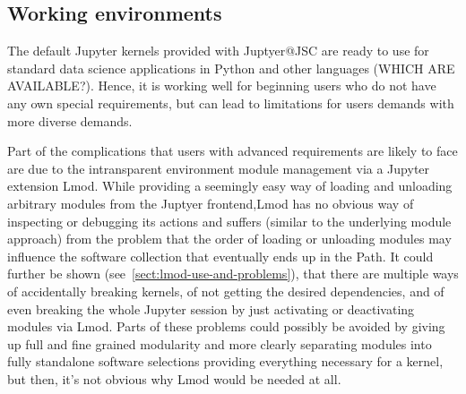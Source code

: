\subsection{Working environments}


The default Jupyter kernels provided with Juptyer@JSC are ready to use for standard data science applications in Python and other languages (WHICH ARE AVAILABLE?).
Hence, it is working well for beginning users who do not have any own special requirements, but can lead to limitations for users demands with more diverse demands.

Part of the complications that users with advanced requirements are likely to face are due to the intransparent environment module management via a Jupyter extension Lmod.
While providing a seemingly easy way of loading and unloading arbitrary modules from the Juptyer frontend,Lmod has no obvious way of inspecting or debugging its actions and suffers (similar to the underlying module approach) from the problem that the order of loading or unloading modules may influence the software collection that eventually ends up in the Path.
It could further be shown (see~\ref{sect:lmod-use-and-problems}), that there are multiple ways of accidentally breaking kernels, of not getting the desired dependencies, and of even breaking the whole Jupyter session by just activating or deactivating modules via Lmod.
Parts of these problems could possibly be avoided by giving up full and fine grained modularity and more clearly separating modules into fully standalone software selections providing everything necessary for a kernel, but then, it's not obvious why Lmod would be needed at all.

